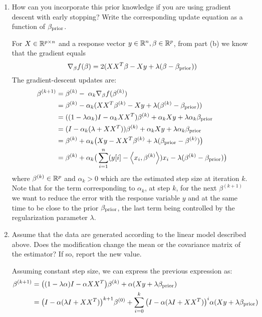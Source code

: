 \documentclass[12pt,twoside]{article}
\begin{document}
\begin{enumerate}
\begin{enumerate}
    \item How can you incorporate this prior knowledge if you are using gradient descent with early stopping? Write the corresponding update equation as a function of $\beta_{\operatorname{prior}}$.\\
\medskip

For $X  \in \mathbb{R}^{p \times n}$ and a response vector $y \in \mathbb{R}^n, \beta \in \mathbb{R}^p$, from part (b) we know that the gradient equals $$\nabla_{\beta} f(\beta) =	2 (X X^T \beta - X y +  \lambda (\beta - \beta_{\operatorname{prior}}))$$
The gradient-descent updates are:
\begin{align*}
		\beta^{(k+1)}	&=	\beta^{(k)} - \; \alpha_k \nabla_{\beta} f(\beta^{(k)})	\\
					&=	\beta^{(k)}  - \alpha_k (X X^T \beta^{(k)} - X y +  \lambda (\beta^{(k)} - \beta_{\operatorname{prior}})) \\
					&=    ((1- \lambda \alpha_k) I  - \alpha_k X X^T) \beta^{(k)}  +  \alpha_k  X y  + \lambda  \alpha_k  \beta_{\operatorname{prior}} \\
					&=	(I -  \alpha_k (\lambda +  X X^T)) \beta^{(k)}  +  \alpha_k  X y  + \lambda  \alpha_k  \beta_{\operatorname{prior}} \\
					&=	\beta^{(k)}  + \alpha_k  \big( X y  - X X^T \beta^{(k)}   + \lambda (\beta_{\operatorname{prior}} - \beta^{(k)}) \big) \\
					&=	 \beta^{(k)}  +  \alpha_k  \big( \sum_{i=1}^n (y[i] - \left \langle x_i, \beta^{(k)}\right \rangle) x_i - \lambda ( \beta^{(k)}  -   \beta_{\operatorname{prior}}) \big)
\end{align*}
   where $\beta^{(k)} \in \mathbb{R}^p$ and $ \alpha_k > 0$ which are the estimated step size at iteration $k$. Note that for the term corresponding to $\alpha_k$, at  step $k$, for the next $\beta^{(k+1)}$ 
   we want to reduce the error with the response variable $y$  and at the same time to be close to the prior $\beta_{\operatorname{prior}}$, the last term being controlled by the regularization parameter $\lambda$.
   
    \item Assume that the data are generated according to the linear model described above. Does the modification change the mean or the covariance matrix of the estimator? If so, report the new value.\\
    
\medskip

Assuming constant step size, we can express the previous expression as:
\begin{align*}
		\beta^{(k+1)}	&=	\big( (1 - \lambda \alpha)  I - \alpha X X^T \big) \beta^{(k)}		+  	\alpha (X y + \lambda \beta_{\operatorname{prior}}) \\
					&=	\big(I - \alpha (\lambda I + X X^T)  \big)^{k+1} \beta^{(0)}		+	\sum_{i=0}^k \big(I - \alpha (\lambda I + X X^T)  \big)^i \alpha (X y + \lambda \beta_{\operatorname{prior}})
\end{align*}


\end{enumerate}
\end{enumerate}
\end{document}

